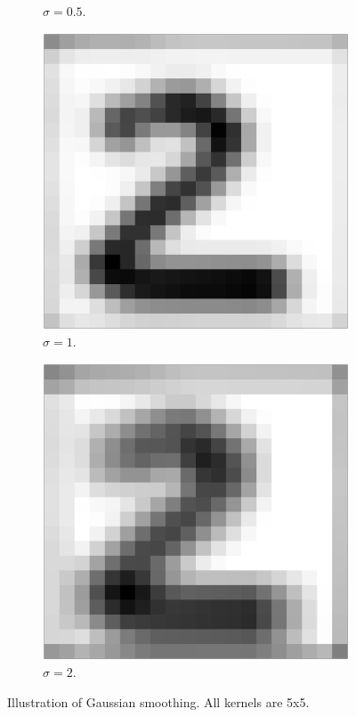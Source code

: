 \begin{figure}[H]
\begin{subfigure}[b]{0.2\textwidth}
         \caption{\(\sigma = 0.5\).}
	\end{subfigure}
	\qquad
	\begin{subfigure}[b]{0.2\textwidth}
         \includegraphics[width=\textwidth]{graphics/smooth_1_5}
         \caption{\(\sigma = 1\).}
	\end{subfigure}
	\qquad
	\begin{subfigure}[b]{0.2\textwidth}
         \includegraphics[width=\textwidth]{graphics/smooth_2_5}
         \caption{\(\sigma = 2\).}
	\end{subfigure}
\caption[Effects of smoothing on image.]{Illustration of Gaussian smoothing. All kernels are 5x5.}
\label{fig:effect_smooth}
\end{figure}

